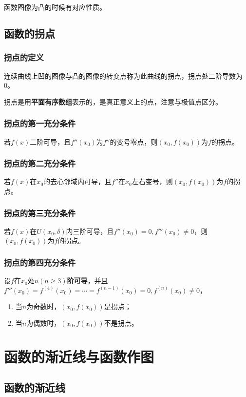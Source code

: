 函数图像为凸的时候有对应性质。
\subsection{函数的拐点}
\subsubsection{拐点的定义}
\begin{definition}
	连续曲线上凹的图像与凸的图像的转变点称为此曲线的拐点，拐点处二阶导数为0。
\end{definition}
\begin{remark}
	拐点是用\textbf{平面有序数组}表示的，是真正意义上的点，注意与极值点区分。
\end{remark}
\subsubsection{拐点的第一充分条件}
若$f(x)$二阶可导，且$f''(x_0)$为$f''$的变号零点，则$(x_0,f(x_0))$为$f$的拐点。
\subsubsection{拐点的第二充分条件}
若$f(x)$在$x_0$的去心邻域内可导，且$f''$在$x_0$左右变号，则$(x_0,f(x_0))$为$f$的拐点。
\subsubsection{拐点的第三充分条件}
若$f(x)$在$U(x_0,\delta)$内三阶可导，且$f''(x_0)=0,f'''(x_0)\neq 0$，则$(x_0,f(x_0))$为$f$的拐点。
\subsubsection{拐点的第四充分条件}
设$f$在$x_0$处\textbf{$n(n\geq 3)$阶可导}，并且$f'''(x_0)=f^{(4)}(x_0)=\cdots =f^{(n-1)}(x_0)=0,f^{(n)}(x_0)\neq 0$，
\begin{enumerate}
	\item 当$n$为奇数时，$(x_0,f(x_0))$是拐点；
	\item 当$n$为偶数时，$(x_0,f(x_0))$不是拐点。
\end{enumerate}
\section{函数的渐近线与函数作图}
\subsection{函数的渐近线}
